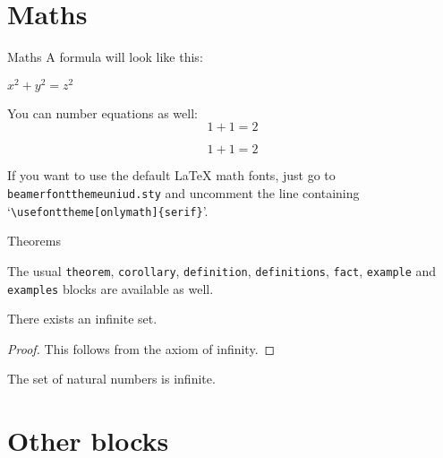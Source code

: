 \documentclass[usenames,dvipsnames]{beamer}
\begin{document}
\section{Maths}

\begin{frame}{Maths}
A formula will look like this:
\begin{center}
 $x^2 + y^2 = z^2$
\end{center}

You can number equations as well:
\begin{equation}
1+1=2
\end{equation}

\begin{equation}
1+1=2 \tag{custom label!}
\end{equation}

\vskip 0.5cm

If you want to use the default \LaTeX{} math fonts, just go to \texttt{beamerfontthemeuniud.sty} and uncomment the line containing `\texttt{\textbackslash usefonttheme[onlymath]\{serif\}}'.

\end{frame}

\begin{frame}{Theorems}

The usual \texttt{theorem}, \texttt{corollary}, \texttt{definition}, \texttt{definitions}, \texttt{fact}, \texttt{example} and \texttt{examples} blocks are available as well.

\begin{theorem}
There exists an infinite set.
\end{theorem}
\begin{proof}
This follows from the axiom of infinity.
\end{proof}
\begin{example}
The set of natural numbers is infinite.
\end{example}

\end{frame}

\section{Other blocks}
\end{document}
